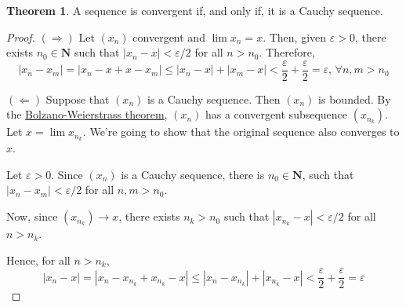\documentclass[tikz,12pt,a4paper]{article}
\theoremstyle{definition}
\newtheorem{theorem}{Theorem}[section]
\newtheorem{lemma}[theorem]{Lemma}
\begin{document}
%
%  
%
%  
%

\begin{theorem}
	A sequence is convergent if, and only if, it is a Cauchy sequence.
\end{theorem}

\begin{proof}
	$(\Rightarrow)$ Let $(x_n)$ convergent and $\lim x_n = x$. Then, given $\varepsilon > 0$, there exists $n_0 \in \textbf{N}$ such that $|x_n - x| < \varepsilon/2$ for all $n > n_0$. Therefore,
	\[
		|x_n - x_m| = |x_n - x + x - x_m| \leq |x_n - x| + |x_m - x| < \frac{\varepsilon}{2} + \frac{\varepsilon}{2} = \varepsilon, \, \forall n,m > n_0
	\]
	
	$(\Leftarrow)$ Suppose that $(x_n)$ is a Cauchy sequence. Then $(x_n)$ is bounded. By the \hyperref[bolz-weier]{Bolzano-Weierstrass theorem}, $(x_n)$ has a convergent subsequence $(x_{n_k})$. Let $x = \lim x_{n_k}$. We're going to show that the original sequence also converges to $x$.
	
	Let $\varepsilon > 0$. Since $(x_n)$ is a Cauchy sequence, there is $n_0 \in \textbf{N}$, such that $|x_n - x_m| < \varepsilon/2$ for all $n,m > n_0$.
	
	Now, since $(x_{n_k}) \longrightarrow x$, there exists $n_k > n_0$ such that $|x_{n_k} - x| < \varepsilon/2$ for all $n > n_k$.
	
	Hence, for all $n > n_k$, 
	\[
		|x_n - x| = |x_n - x_{n_k} + x_{n_k} - x| \leq |x_n - x_{n_k}| + |x_{n_k} - x| < \frac{\varepsilon}{2} + \frac{\varepsilon}{2} = \varepsilon
	\]
\end{proof}
\end{document}
